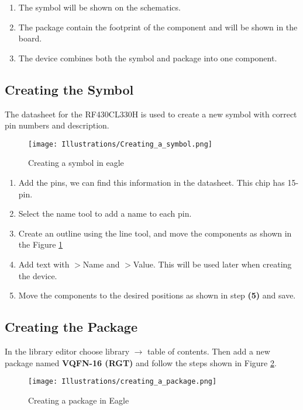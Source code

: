 \begin{enumerate}
\item The symbol will be shown on the schematics.
\item The package contain the footprint of the component and will be shown in the board.
\item The device combines both the symbol and package into one component.
\end{enumerate} 


\subsection{Creating the Symbol}
The datasheet for the RF430CL330H \cite{TexasInstruments2012} is used to create a new symbol with correct pin numbers and description. 

\begin{figure}[h]
\begin{center}
\center
\texttt{[image: Illustrations/Creating\_a\_symbol.png]} 
\caption{Creating a symbol in eagle}
\label{symbol}
\end{center}
\end{figure}

\begin{enumerate}
\item Add the pins, we can find this information in the datasheet. This chip has 15-pin.
\item Select the name tool to add a name to each pin.
\item Create an outline using the line tool, and move the components as shown in the Figure \ref{symbol}
\item Add text with $>$Name and $>$Value. This will be used later when creating the device.
\item Move the components to the desired positions as shown in step \textbf{(5)} and save.
\end{enumerate}


\subsection{Creating the Package}
In the library editor choose library $\rightarrow$ table of contents. Then add a new package named \textbf{VQFN-16 (RGT)} and follow the steps shown in Figure \ref{creating_package}.
\begin{figure}[h]
\begin{center}
\center
\texttt{[image: Illustrations/creating\_a\_package.png]} 
\caption{Creating a package in Eagle}
\label{creating_package}
\end{center}
\end{figure}

